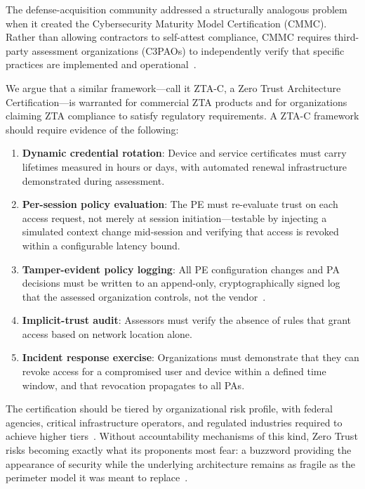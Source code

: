 \documentclass[sigconf,nonacm]{acmart}
\begin{document}
The defense-acquisition community addressed a structurally analogous problem
when it created the Cybersecurity Maturity Model Certification (CMMC). Rather
than allowing contractors to self-attest compliance, CMMC requires third-party
assessment organizations (C3PAOs) to independently verify that specific practices
are implemented and operational~\cite{cmmc_dod2023}.

We argue that a similar framework---call it ZTA-C, a Zero Trust Architecture
Certification---is warranted for commercial ZTA products and for organizations
claiming ZTA compliance to satisfy regulatory requirements. A ZTA-C framework
should require evidence of the following:

\begin{enumerate}
\sloppy
  \item \textbf{Dynamic credential rotation}: Device and service certificates
        must carry lifetimes measured in hours or days, with automated renewal
        infrastructure demonstrated during assessment.

  \item \textbf{Per-session policy evaluation}: The PE must re-evaluate trust
        on each access request, not merely at session initiation---testable by
        injecting a simulated context change mid-session and verifying that
        access is revoked within a configurable latency bound.

  \item \textbf{Tamper-evident policy logging}: All PE configuration changes
        and PA decisions must be written to an append-only, cryptographically
        signed log that the assessed organization controls, not the
        vendor~\cite{nist800207}.

  \item \textbf{Implicit-trust audit}: Assessors must verify the absence of
        rules that grant access based on network location alone.

  \item \textbf{Incident response exercise}: Organizations must demonstrate
        that they can revoke access for a compromised user and device within a
        defined time window, and that revocation propagates to all PAs.
\end{enumerate}

The certification should be tiered by organizational risk profile, with federal
agencies, critical infrastructure operators, and regulated industries required
to achieve higher tiers~\cite{cisa_zt_strategy2022}. Without accountability
mechanisms of this kind, Zero Trust risks becoming exactly what its proponents
most fear: a buzzword providing the appearance of security while the underlying
architecture remains as fragile as the perimeter model it was meant to
replace~\cite{rose_zt_pitfalls2022,gartner_zt_market2023}.
\end{document}
